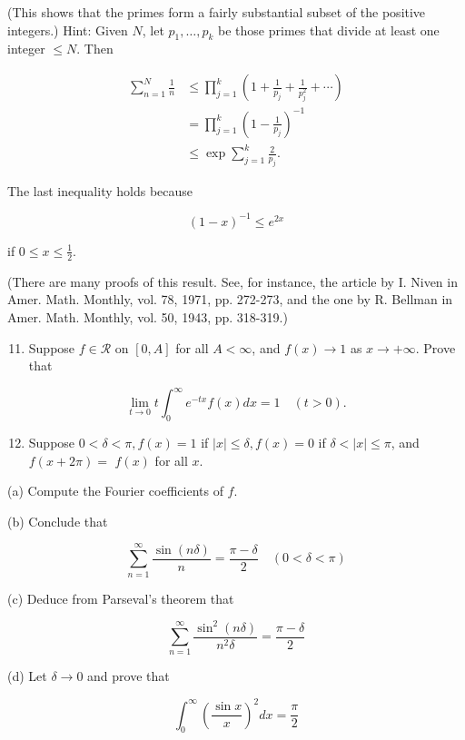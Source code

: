 \documentclass[10pt]{article}
\begin{document}
(This shows that the primes form a fairly substantial subset of the positive integers.) Hint: Given $N$, let $p_{1}, \ldots, p_{k}$ be those primes that divide at least one integer $\leq N$. Then

$$
\begin{aligned}
\sum_{n=1}^{N} \frac{1}{n} & \leq \prod_{j=1}^{k}\left(1+\frac{1}{p_{j}}+\frac{1}{p_{j}^{2}}+\cdots\right) \\
& =\prod_{j=1}^{k}\left(1-\frac{1}{p_{j}}\right)^{-1} \\
& \leq \exp \sum_{j=1}^{k} \frac{2}{p_{j}} .
\end{aligned}
$$

The last inequality holds because

$$
(1-x)^{-1} \leq e^{2 x}
$$

if $0 \leq x \leq \frac{1}{2}$.

(There are many proofs of this result. See, for instance, the article by I. Niven in Amer. Math. Monthly, vol. 78, 1971, pp. 272-273, and the one by R. Bellman in Amer. Math. Monthly, vol. 50, 1943, pp. 318-319.)

\begin{enumerate}
  \setcounter{enumi}{10}
  \item Suppose $f \in \mathscr{R}$ on $[0, A]$ for all $A<\infty$, and $f(x) \rightarrow 1$ as $x \rightarrow+\infty$. Prove that
\end{enumerate}

$$
\lim _{t \rightarrow 0} t \int_{0}^{\infty} e^{-t x} f(x) d x=1 \quad(t>0) .
$$

\begin{enumerate}
  \setcounter{enumi}{11}
  \item Suppose $0<\delta<\pi, f(x)=1$ if $|x| \leq \delta, f(x)=0$ if $\delta<|x| \leq \pi$, and $f(x+2 \pi)=$ $f(x)$ for all $x$.
\end{enumerate}

(a) Compute the Fourier coefficients of $f$.

(b) Conclude that

$$
\sum_{n=1}^{\infty} \frac{\sin (n \delta)}{n}=\frac{\pi-\delta}{2} \quad(0<\delta<\pi)
$$

(c) Deduce from Parseval's theorem that

$$
\sum_{n=1}^{\infty} \frac{\sin ^{2}(n \delta)}{n^{2} \delta}=\frac{\pi-\delta}{2}
$$

(d) Let $\delta \rightarrow 0$ and prove that

$$
\int_{0}^{\infty}\left(\frac{\sin x}{x}\right)^{2} d x=\frac{\pi}{2}
$$
\end{document}
